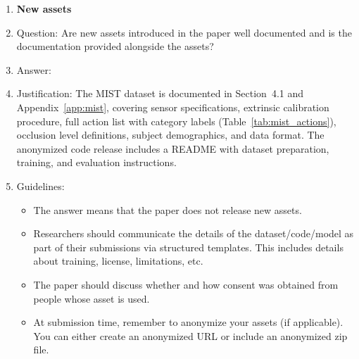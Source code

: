 \begin{enumerate}
\item {\bf New assets}
    \item[] Question: Are new assets introduced in the paper well documented and is the documentation provided alongside the assets?
    \item[] Answer: \answerYes{}
    \item[] Justification: The MIST dataset is documented in Section~4.1 and Appendix~\ref{app:mist}, covering sensor specifications, extrinsic calibration procedure, full action list with category labels (Table~\ref{tab:mist_actions}), occlusion level definitions, subject demographics, and data format. The anonymized code release includes a README with dataset preparation, training, and evaluation instructions.
    \item[] Guidelines:
    \begin{itemize}
        \item The answer \answerNA{} means that the paper does not release new assets.
        \item Researchers should communicate the details of the dataset\slash code\slash model as part of their submissions via structured templates. This includes details about training, license, limitations, etc.
        \item The paper should discuss whether and how consent was obtained from people whose asset is used.
        \item At submission time, remember to anonymize your assets (if applicable). You can either create an anonymized URL or include an anonymized zip file.
    \end{itemize}


\end{enumerate}
